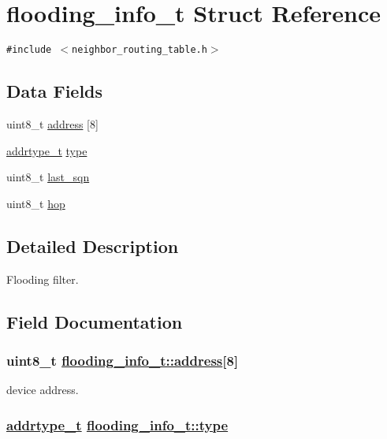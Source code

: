 \hypertarget{structflooding__info__t}{
\section{flooding\_\-info\_\-t Struct Reference}
\label{structflooding__info__t}
}
{\tt \#include $<$neighbor\_\-routing\_\-table.h$>$}

\subsection*{Data Fields}
\begin{CompactItemize}
\item 
uint8\_\-t \hyperlink{structflooding__info__t_f8a1029d2d0f7c82b56af1d565ae18bd}{address} \mbox{[}8\mbox{]}
\item 
\hyperlink{address_8h_faf76b5591da0abd0584dec411d0551d}{addrtype\_\-t} \hyperlink{structflooding__info__t_e3eed07d2a7f7d95ec2afb8127df41ec}{type}
\item 
uint8\_\-t \hyperlink{structflooding__info__t_6718f265896281cd2d48b337197dfbee}{last\_\-sqn}
\item 
uint8\_\-t \hyperlink{structflooding__info__t_ea7764e5ced0875f8ebc542021c616e3}{hop}
\end{CompactItemize}


\subsection{Detailed Description}
Flooding filter. 



\subsection{Field Documentation}
\hypertarget{structflooding__info__t_f8a1029d2d0f7c82b56af1d565ae18bd}{
\subsubsection[address]{\setlength{\rightskip}{0pt plus 5cm}uint8\_\-t \hyperlink{structflooding__info__t_f8a1029d2d0f7c82b56af1d565ae18bd}{flooding\_\-info\_\-t::address}\mbox{[}8\mbox{]}}}
\label{structflooding__info__t_f8a1029d2d0f7c82b56af1d565ae18bd}


device address. \hypertarget{structflooding__info__t_e3eed07d2a7f7d95ec2afb8127df41ec}{
\subsubsection[type]{\setlength{\rightskip}{0pt plus 5cm}\hyperlink{address_8h_faf76b5591da0abd0584dec411d0551d}{addrtype\_\-t} \hyperlink{structflooding__info__t_e3eed07d2a7f7d95ec2afb8127df41ec}{flooding\_\-info\_\-t::type}}}
\label{structflooding__info__t_e3eed07d2a7f7d95ec2afb8127df41ec}


